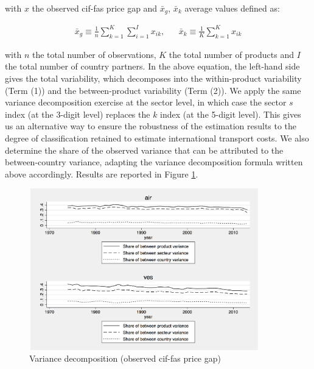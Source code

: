 \documentclass[11pt,twoside, authoryear]{elsarticle}
\begin{document}
with $x$ the observed cif-fas price gap and $\bar{x}_g$, $\bar{x}_k$ average values defined as:

\begin{eqnarray*}
\bar{x}_g \equiv \frac{1}{n} \sum_{k=1}^K \sum_{i=1}^I x_{ik},&& \bar{x}_k \equiv \frac{1}{K}\sum_{k=1}^K x_{ik}
\end{eqnarray*}

\noindent with $n$ the total number of observations, $K$ the total number of products and $I$ the total number of country partners. In the above equation, the left-hand side gives the total variability, which decomposes into the within-product variability (Term (1)) and the between-product variability (Term (2)).
We apply the same variance decomposition exercise at the sector level, in which case the sector $s$ index (at the 3-digit level) replaces the $k$ index (at the 5-digit level).
This gives us an alternative way to ensure the robustness of the estimation results to the degree of classification retained to estimate international transport costs.
We also determine the share of the observed variance that can be attributed to the between-country variance, adapting the variance decomposition formula written above accordingly.
Results are reported in Figure \ref{fig:decomp_variance}.

\begin{figure}[htbp]
\caption{Variance decomposition (observed cif-fas price gap)}
\label{fig:decomp_variance}
\begin{center}
\includegraphics[width=10cm, height=7cm]{variance_decomposition.pdf}
\end{center}
\end{figure}
\end{document}

